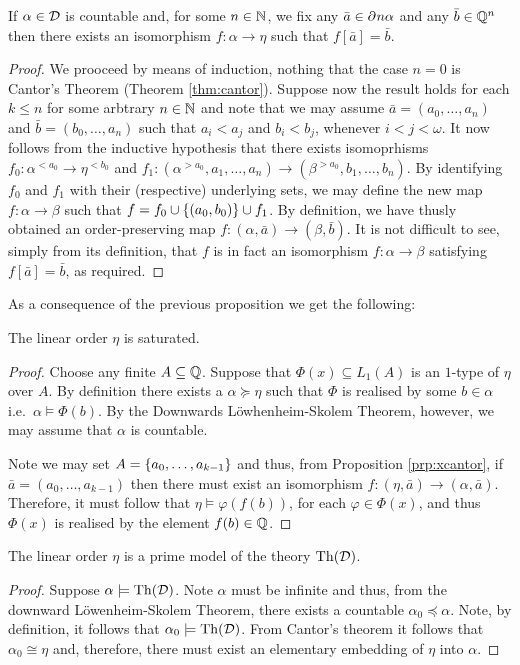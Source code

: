 \begin{prp}\label{prp:xcantor} If $\alpha\in\mathcal{D}$ is countable and, for some
	$n\in\mathbb{N}$, we fix any $\bar{a}\in\partial^{}{n}\alpha$ and any $\bar{b}\in\mathbb{Q}^n$
	then there exists an isomorphism $f\colon\alpha\to\eta$ such that
	$f[\bar{a}]=\bar{b}$.
\end{prp}
\begin{proof} We prooceed by means of induction, nothing that the case $n=0$ is
	Cantor's Theorem (Theorem \ref{thm:cantor}).  Suppose now the result holds for
	each $k\leq n$ for some arbtrary $n\in\mathbb{N}$ and note that we may assume
	$\bar{a}=(a_0,\dotsc,a_n)$ and $\bar{b}=(b_0,\dotsc,a_n)$ such that $a_i<a_j$
	and $b_i<b_j$, whenever $i<j<\omega$.  It now follows from the inductive
	hypothesis that there exists isomoprhisms $f_0\colon\alpha^{<a_0}\to\eta^{<b_0}$
	and $f_1\colon(\alpha^{>a_0},a_1,\dotsc,a_n)\to(\beta^{>a_0},b_1,\dotsc,b_n)$.
	By identifying $f_0$ and $f_1$ with their (respective) underlying sets, we may
	define the new map $f\colon\alpha\to\beta$ such that
	$f=f_0\cup\left\lbrace (a_0,b_0)\right\rbrace\cup f_1$.  By definition, we have thusly obtained an
	order-preserving map $f\colon(\alpha,\bar{a})\to(\beta,\bar{b})$.  It is not
	difficult to see, simply from its definition, that $f$ is in fact an isomorphism
	$f\colon\alpha\to\beta$ satisfying $f[\bar{a}]=\bar{b}$, as required.
\end{proof}

As a consequence of the previous proposition we get the following:
\begin{prp} The linear order $\eta$ is saturated.
\end{prp}
\begin{proof} Choose any finite $A\subseteq\mathbb{Q}$.  Suppose that
	$\Phi(x)\subseteq L_1(A)$ is an $1$-type of $\eta$ over $A$.  By definition
	there exists a $\alpha\succcurlyeq\eta$ such that $\Phi$ is realised by some
	$b\in\alpha$ i.e.\ $\alpha\models\Phi(b)$.  By the Downwards L\"owhenheim-Skolem
	Theorem, however, we may assume that $\alpha$ is countable.

	Note we may set $A=\left\lbrace a_0,\dotsc,a_{k-1}\right\rbrace$ and thus, from Proposition
	\ref{prp:xcantor}, if $\bar{a}=(a_0,\dotsc,a_{k-1})$ then there must exist an
	isomorphism $f\colon(\eta,\bar{a})\to(\alpha,\bar{a})$.  Therefore, it must
	follow that $\eta\models\varphi(f(b))$, for each $\varphi\in\Phi(x)$, and thus
	$\Phi(x)$ is realised by the element $f(b)\in\mathbb{Q}$.
\end{proof}


\begin{thm} The linear order $\eta$ is a prime model of the theory
	$\operatorname{Th}(\mathcal{D})$.
\end{thm}
\begin{proof} Suppose $\alpha\models\operatorname{Th}(\mathcal{D})$.  Note $\alpha$ must be
	infinite and thus, from the downward L\"owenheim-Skolem Theorem, there exists a
	countable $\alpha_0\preccurlyeq\alpha$. Note, by definition, it follows that
	$\alpha_{0}\models\operatorname{Th}(\mathcal{D})$.  From Cantor's theorem it follows that
	$\alpha_0\cong\eta$ and, therefore, there must exist an elementary embedding of
	$\eta$ into $\alpha$.
\end{proof}

